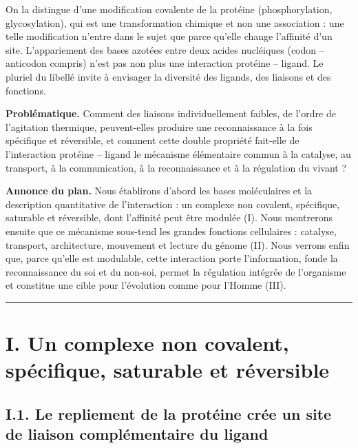 \documentclass[11pt,a4paper]{article}
\begin{document}
On la distingue d'une modification covalente de la protéine (phosphorylation, glycosylation), qui est une transformation chimique et non une association : une telle modification n'entre dans le sujet que parce qu'elle change l'affinité d'un site. L'appariement des bases azotées entre deux acides nucléiques (codon -- anticodon compris) n'est pas non plus une interaction protéine -- ligand. Le pluriel du libellé invite à envisager la diversité des ligands, des liaisons et des fonctions.

\textbf{Problématique.} Comment des liaisons individuellement faibles, de l'ordre de l'agitation thermique, peuvent-elles produire une reconnaissance à la fois spécifique et réversible, et comment cette double propriété fait-elle de l'interaction protéine -- ligand le mécanisme élémentaire commun à la catalyse, au transport, à la communication, à la reconnaissance et à la régulation du vivant ?

\textbf{Annonce du plan.} Nous établirons d'abord les bases moléculaires et la description quantitative de l'interaction : un complexe non covalent, spécifique, saturable et réversible, dont l'affinité peut être modulée (I). Nous montrerons ensuite que ce mécanisme sous-tend les grandes fonctions cellulaires : catalyse, transport, architecture, mouvement et lecture du génome (II). Nous verrons enfin que, parce qu'elle est modulable, cette interaction porte l'information, fonde la reconnaissance du soi et du non-soi, permet la régulation intégrée de l'organisme et constitue une cible pour l'évolution comme pour l'Homme (III).

\begin{center}\rule{0.5\linewidth}{0.5pt}\end{center}

\hypertarget{i.-un-complexe-non-covalent-spuxe9cifique-saturable-et-ruxe9versible}{%
\section{I. Un complexe non covalent, spécifique, saturable et réversible}\label{i.-un-complexe-non-covalent-spuxe9cifique-saturable-et-ruxe9versible}}

\hypertarget{i.1.-le-repliement-de-la-protuxe9ine-cruxe9e-un-site-de-liaison-compluxe9mentaire-du-ligand}{%
\subsection{I.1. Le repliement de la protéine crée un site de liaison complémentaire du ligand}\label{i.1.-le-repliement-de-la-protuxe9ine-cruxe9e-un-site-de-liaison-compluxe9mentaire-du-ligand}}
\end{document}
